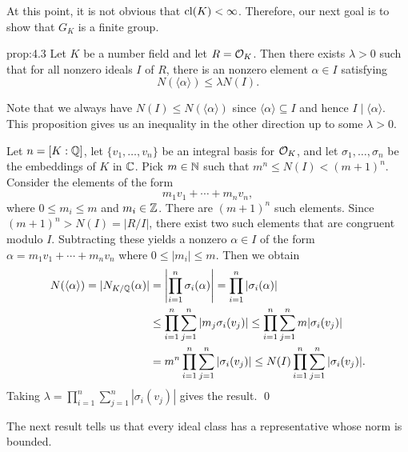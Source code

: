 At this point, it is not obvious that $\operatorname{cl}(K) < \infty$. Therefore, 
our next goal is to show that $G_K$ is a finite group. 

\begin{prop}{prop:4.3}
    Let $K$ be a number field and let $R = {\cal O}_K$. Then there exists
    $\lambda > 0$ such that for all nonzero ideals $I$ of $R$, there 
    is an nonzero element $\alpha \in I$ satisfying 
    \[ N(\langle \alpha \rangle) \leq \lambda N(I). \] 
\end{prop}\vspace{-0.25cm}

Note that we always have $N(I) \leq N(\langle \alpha \rangle)$ since 
$\langle \alpha \rangle \subseteq I$ and hence $I \mid \langle \alpha \rangle$. 
This proposition gives us an inequality in the other direction up to 
some $\lambda > 0$. 

\begin{pf}
    Let $n = [K : \mathbb{Q}]$, let $\{v_1, \dots, v_n\}$ be an integral basis for 
    ${\cal O}_K$, and let $\sigma_1, \dots, \sigma_n$ be the embeddings 
    of $K$ in $\mathbb{C}$. Pick $m \in \mathbb{N}$ such that $m^n \leq N(I) < (m+1)^n$. 
    Consider the elements of the form 
    \[ m_1 v_1 + \cdots + m_n v_n, \] 
    where $0 \leq m_i \leq m$ and $m_i \in \mathbb{Z}$. There are $(m+1)^n$ 
    such elements. Since $(m+1)^n > N(I) = |R/I|$, there exist 
    two such elements that are congruent modulo $I$. Subtracting these 
    yields a nonzero $\alpha \in I$ of the form 
    $\alpha = m_1 v_1 + \cdots + m_n v_n$
    where $0 \leq |m_i| \leq m$. Then we obtain 
    \begin{align*}
        N(\langle \alpha \rangle) = |N_{K/\mathbb{Q}}(\alpha)| 
        &= \left| \prod_{i=1}^n \sigma_i(\alpha) \right| 
        = \prod_{i=1}^n |\sigma_i(\alpha)| \\ 
        &\leq \prod_{i=1}^n \sum_{j=1}^n |m_j \sigma_i(v_j)| 
        \leq \prod_{i=1}^n \sum_{j=1}^n m|\sigma_i(v_j)| \\ 
        &= m^n \prod_{i=1}^n \sum_{j=1}^n |\sigma_i(v_j)| 
        \leq N(I) \prod_{i=1}^n \sum_{j=1}^n |\sigma_i(v_j)|.
    \end{align*}
    Taking $\lambda = \prod_{i=1}^n \sum_{j=1}^n |\sigma_i(v_j)|$ 
    gives the result. \qed 
\end{pf}\vspace{-0.25cm}
The next result tells us that every ideal class has a representative 
whose norm is bounded.


